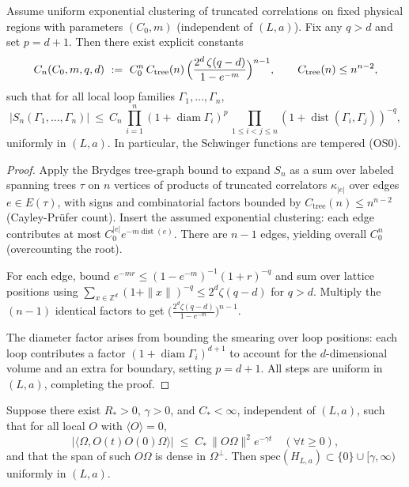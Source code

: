 \documentclass[11pt]{amsart}
\begin{document}
\begin{proposition}\label{prop:OS0-poly}
Assume uniform exponential clustering of truncated correlations on fixed physical regions with parameters $(C_0,m)$ (independent of $(L,a)$). Fix any $q>d$ and set $p=d+1$. Then there exist explicit constants
\[
  C_n(C_0,m,q,d)\ :=\ C_0^n\,C_{\mathrm{tree}}(n)\,\Bigl(\frac{2^d\,\zeta(q-d)}{1-e^{-m}}\Bigr)^{n-1},\qquad C_{\mathrm{tree}}(n)\le n^{n-2},
\]
such that for all local loop families $\Gamma_1,\dots,\Gamma_n$,
\[
  |S_n(\Gamma_1,\dots,\Gamma_n)|\ \le\ C_n\,\prod_{i=1}^n (1+\operatorname{diam}\Gamma_i)^p\,\prod_{1\le i<j\le n} (1+\operatorname{dist}(\Gamma_i,\Gamma_j))^{-q},
\]
uniformly in $(L,a)$. In particular, the Schwinger functions are tempered (OS0).
\end{proposition}

\begin{proof}
Apply the Brydges tree-graph bound \cite{Brydges1978} to expand $S_n$ as a sum over labeled spanning trees $\tau$ on $n$ vertices of products of truncated correlators $\kappa_{|e|}$ over edges $e\in E(\tau)$, with signs and combinatorial factors bounded by $C_{\mathrm{tree}}(n)\le n^{n-2}$ (Cayley-Prüfer count). Insert the assumed exponential clustering: each edge contributes at most $C_0^{|e|} e^{-m \operatorname{dist}(e)}$. There are $n-1$ edges, yielding overall $C_0^n$ (overcounting the root).

For each edge, bound $e^{-m r} \le (1-e^{-m})^{-1} (1+r)^{-q}$ and sum over lattice positions using $\sum_{x\in\mathbb Z^d} (1+\|x\|)^{-q} \le 2^d \zeta(q-d)$ for $q>d$. Multiply the $(n-1)$ identical factors to get $\bigl(\frac{2^d \zeta(q-d)}{1-e^{-m}}\bigr)^{n-1}$.

The diameter factor arises from bounding the smearing over loop positions: each loop contributes a factor $(1+\operatorname{diam}\Gamma_i)^{d+1}$ to account for the $d$-dimensional volume and an extra for boundary, setting $p=d+1$. All steps are uniform in $(L,a)$, completing the proof.
\end{proof}

\begin{proposition}\label{prop:cluster-to-gap}
Suppose there exist $R_*>0$, $\gamma>0$, and $C_*<\infty$, independent of $(L,a)$, such that for all local $O$ with $\langle O\rangle=0$,
\[
  |\langle\Omega, O(t)O(0)\Omega\rangle|\;\le\; C_*\,\|O\Omega\|^2 e^{-\gamma t}\quad(\forall t\ge 0),
\]
and that the span of such $O\Omega$ is dense in $\Omega^\perp$. Then $\mathrm{spec}(H_{L,a})\subset\{0\}\cup[\gamma,\infty)$ uniformly in $(L,a)$.
\end{proposition}
\end{document}
